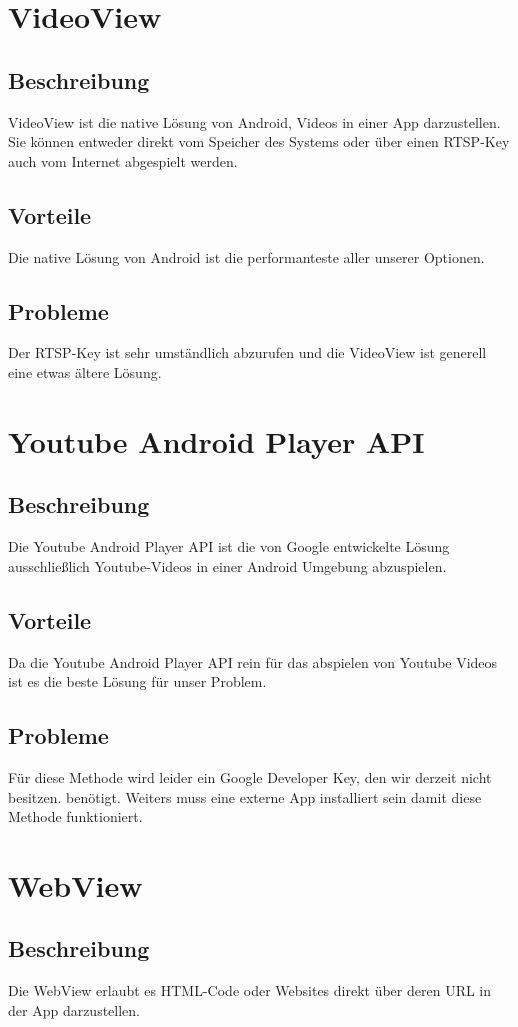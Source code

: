 \documentclass[FIPLY_base.tex]{subfiles}
\begin{document}
\section{VideoView}
\subsection{Beschreibung}
VideoView ist die native Lösung von Android, Videos in einer App darzustellen. Sie können entweder direkt vom Speicher des Systems oder über einen RTSP-Key auch vom Internet  abgespielt werden.
\subsection{Vorteile}
Die native Lösung von Android ist die performanteste aller unserer Optionen.
\subsection{Probleme}
Der RTSP-Key ist sehr umständlich abzurufen und die VideoView ist generell eine etwas ältere Lösung.

\section{Youtube Android Player API}
\subsection{Beschreibung}
Die Youtube Android Player API ist die von Google entwickelte Lösung ausschließlich Youtube-Videos in einer Android Umgebung abzuspielen.
\subsection{Vorteile}
Da die Youtube Android Player API rein für das abspielen von Youtube Videos ist es die beste Lösung für unser Problem.
\subsection{Probleme}
Für diese Methode wird leider ein Google Developer Key, den wir derzeit nicht besitzen. benötigt. Weiters muss eine externe App installiert sein damit diese Methode funktioniert.
\newpage

\section{WebView}
\subsection{Beschreibung}
Die WebView erlaubt es HTML-Code oder Websites direkt über deren URL in der App darzustellen.
\end{document}
